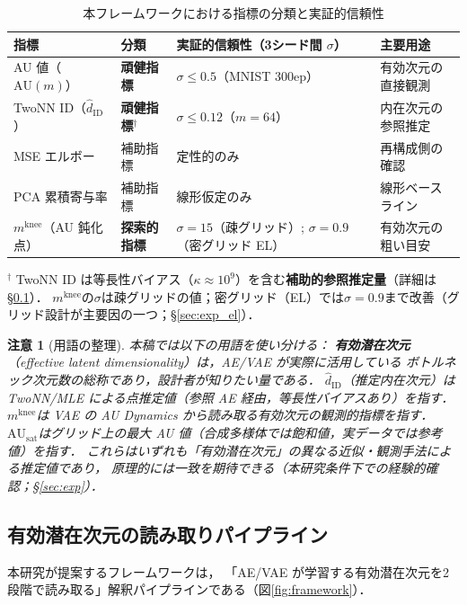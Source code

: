 \documentclass[11pt,a4paper]{jsarticle}
\newtheorem{remark}{注意}
\newcommand{\kap}{\kappa}
\newcommand{\AUsat}{\mathrm{AU}_{\mathrm{sat}}}
\newcommand{\mknee}{m^{\mathrm{knee}}}
\begin{document}
\begin{table}[H]
\centering
\caption{本フレームワークにおける指標の分類と実証的信頼性}
\label{tab:indicator_class}
\small
\begin{tabular}{llll}
\toprule
指標 & 分類 & 実証的信頼性（3シード間 $\sigma$） & 主要用途 \\
\midrule
AU 値（$\mathrm{AU}(m)$） & \textbf{頑健指標} & $\sigma \leq 0.5$（MNIST 300ep） & 有効次元の直接観測 \\
TwoNN ID（$\hat{d}_\mathrm{ID}$） & \textbf{頑健指標}$^\dagger$ & $\sigma \leq 0.12$（$m=64$） & 内在次元の参照推定 \\
MSE エルボー & 補助指標 & 定性的のみ & 再構成側の確認 \\
PCA 累積寄与率 & 補助指標 & 線形仮定のみ & 線形ベースライン \\
$\mknee$（AU 鈍化点） & \textbf{探索的指標} & $\sigma = 15$（疎グリッド）; $\sigma = 0.9$（密グリッド EL） & 有効次元の粗い目安 \\
\bottomrule
\end{tabular}
\medskip
\footnotesize
$^\dagger$ TwoNN ID は等長性バイアス（$\kap \approx 10^9$）を含む\textbf{補助的参照推定量}（詳細は§\ref{sec:framework_pipeline}）．
$\mknee$の$\sigma$は疎グリッドの値；密グリッド（EL）では$\sigma=0.9$まで改善（グリッド設計が主要因の一つ；§\ref{sec:exp_el}）．
\normalsize
\end{table}

\begin{remark}[用語の整理]
本稿では以下の用語を使い分ける：
\textbf{有効潜在次元}（effective latent dimensionality）は，AE/VAE が実際に活用している
ボトルネック次元数の総称であり，設計者が知りたい量である．
\textbf{$\hat{d}_\mathrm{ID}$}（推定内在次元）は TwoNN/MLE による点推定値（参照 AE 経由，等長性バイアスあり）を指す．
\textbf{$\mknee$}は VAE の AU Dynamics から読み取る有効次元の観測的指標を指す．
\textbf{$\AUsat$}はグリッド上の最大 AU 値（合成多様体では飽和値，実データでは参考値）を指す．
これらはいずれも「有効潜在次元」の異なる近似・観測手法による推定値であり，
原理的には一致を期待できる（本研究条件下での経験的確認；§\ref{sec:exp}）．
\end{remark}

\subsection{有効潜在次元の読み取りパイプライン}\label{sec:framework_pipeline}

本研究が提案するフレームワークは，
「AE/VAE が学習する有効潜在次元を2段階で読み取る」解釈パイプラインである（図\ref{fig:framework}）．
\end{document}

